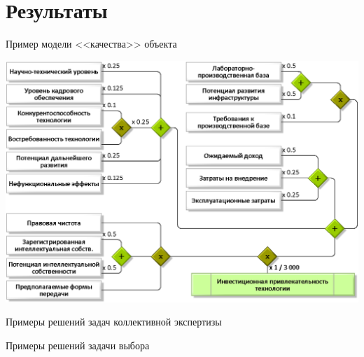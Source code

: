  
\section{Результаты}
\begin{frame}{Пример модели <<качества>> объекта}
	\begin{center}
		\includegraphics[width=0.85\linewidth]{./pic/schemeF2}
	\end{center}
\end{frame} %

\begin{frame}{Примеры решений задач коллективной экспертизы}
 \begin{center}

 \end{center}
\end{frame} %

\begin{frame}{Примеры решений задачи выбора}
 \begin{center}

 \end{center}
\end{frame} %
